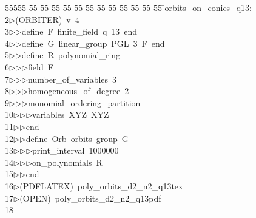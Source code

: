 %
%
\begin{tabbing}
55555 \= 55 \= 55 \= 55 \= 55 \= 55 \= 55 \= 55 \= 55 \= 55 \= 55 \= 55 \= 55 \= \>orbits\_on\_conics\_q13:\\[0pt]
2\>$\triangleright$\>(ORBITER)\ v\ 4\ \\[0pt]
3\>$\triangleright$\>$\triangleright$\>define\ F\ finite\_field\ q\ 13\ end\ \\[0pt]
4\>$\triangleright$\>$\triangleright$\>define\ G\ linear\_group\ PGL\ 3\ F\ end\ \\[0pt]
5\>$\triangleright$\>$\triangleright$\>define\ R\ polynomial\_ring\ \\[0pt]
6\>$\triangleright$\>$\triangleright$\>$\triangleright$\>field\ F\ \\[0pt]
7\>$\triangleright$\>$\triangleright$\>$\triangleright$\>number\_of\_variables\ 3\ \\[0pt]
8\>$\triangleright$\>$\triangleright$\>$\triangleright$\>homogeneous\_of\_degree\ 2\ \\[0pt]
9\>$\triangleright$\>$\triangleright$\>$\triangleright$\>monomial\_ordering\_partition\ \\[0pt]
10\>$\triangleright$\>$\triangleright$\>$\triangleright$\>variables\ XYZ\ XYZ\ \\[0pt]
11\>$\triangleright$\>$\triangleright$\>end\ \\[0pt]
12\>$\triangleright$\>$\triangleright$\>define\ Orb\ orbits\ group\ G\ \\[0pt]
13\>$\triangleright$\>$\triangleright$\>$\triangleright$\>print\_interval\ 1000000\ \\[0pt]
14\>$\triangleright$\>$\triangleright$\>$\triangleright$\>on\_polynomials\ R\ \\[0pt]
15\>$\triangleright$\>$\triangleright$\>end\\[0pt]
16\>$\triangleright$\>(PDFLATEX)\ poly\_orbits\_d2\_n2\_q13tex\\[0pt]
17\>$\triangleright$\>(OPEN)\ poly\_orbits\_d2\_n2\_q13pdf\\[0pt]
18\>\end{tabbing}
